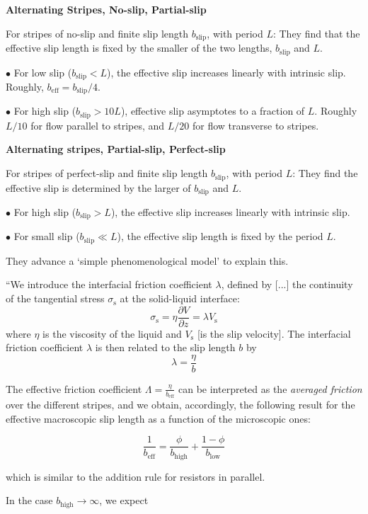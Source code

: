 \documentclass{article}
\begin{document}
\textbf{Alternating Stripes, No-slip, Partial-slip}

For stripes of no-slip and finite slip length $b_{\mathrm{slip}}$, with period $L$:
They find that the effective slip length is fixed by the smaller of the two lengths, $b_{\mathrm{slip}}$ and $L$.

$\bullet$ For low slip ($b_{\mathrm{slip}} < L$), the effective slip increases linearly with intrinsic slip.  Roughly, $b_{\mathrm{eff}}= b_{\mathrm{slip}}/4$.

$\bullet$ For high slip ($b_{\mathrm{slip}} > 10 L$), effective slip asymptotes to a fraction of $L$. Roughly $L/10$ for flow parallel to stripes, and $L/20$ for flow transverse to stripes.

\textbf{Alternating stripes, Partial-slip, Perfect-slip}

For stripes of perfect-slip and finite slip length $b_{\mathrm{slip}}$, with period $L$:
They find the effective slip is determined by the larger of $b_{\mathrm{slip}}$ and $L$. 

$\bullet$ For high slip ($b_{\mathrm{slip}} > L$), the effective slip increases linearly with intrinsic slip.

$\bullet$ For small slip ($b_{\mathrm{slip}} \ll L$), the effective slip length is fixed by the period $L$.


They advance a `simple phenomenological model' to explain this.

``We introduce the interfacial friction coefficient $\lambda$, defined by [...] the continuity of the tangential stress $\sigma_{\mathrm{s}}$ at the solid-liquid interface:
\[ \sigma_{\mathrm{s}} = \eta \frac{\partial V}{\partial z} = \lambda V_{\mathrm{s}} \]
where $\eta$ is the viscosity of the liquid and $V_{\mathrm{s}}$ [is the slip velocity].  The interfacial friction coefficient $\lambda$ is then related to the slip length $b$ by
\[ \lambda = \frac{\eta}{b} \]

The effective friction coefficient $\Lambda = \frac{\eta}{b_{\mathrm{eff}}}$ can be interpreted as the \emph{averaged friction} over the different stripes, and we obtain, accordingly, the following result for the effective macroscopic slip length as a function of the microscopic ones:

\[ \frac{1}{b_{\mathrm{eff}}} = \frac{\phi}{b_{\mathrm{high}}} + \frac{1-\phi}{b_{\mathrm{low}}} \]

which is similar to the addition rule for resistors in parallel.

In the case $b_{\mathrm{high}} \rightarrow \infty$, we expect
\end{document}
